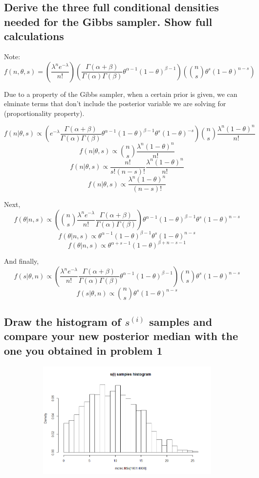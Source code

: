 \documentclass[20pt]{article} %
\begin{document}
\subsection{Derive the three full conditional densities needed for the Gibbs sampler. Show full calculations}
Note: 
$$f(n, \theta, s) = (\frac{\lambda^{n}e^{-\lambda}}{n!})(\frac{\Gamma(\alpha + \beta)}{\Gamma(\alpha)\Gamma(\beta)}\theta^{\alpha-1}(1-\theta)^{\beta-1})({n\choose s}\theta^{s}(1-\theta)^{n-s})$$

Due to a property of the Gibbs sampler, when a certain prior is given, we can elminate terms that don't include the posterior variable we are solving for (proportionality property). 

$$f(n|\theta, s) \propto (e^{-\lambda}\frac{\Gamma(\alpha + \beta)}{\Gamma(\alpha)\Gamma(\beta)}\theta^{\alpha-1}(1-\theta)^{\beta-1}\theta^{s}(1-\theta)^{-s}){n \choose s}\frac{\lambda^{n}(1-\theta)^{n}}{n!}$$
$$f(n|\theta, s) \propto {n \choose s}\frac{\lambda^{n}(1-\theta)^{n}}{n!}$$
$$f(n|\theta, s) \propto \frac{n!}{s!(n-s)!}\frac{\lambda^{n}(1-\theta)^{n}}{n!}$$
$$f(n|\theta, s) \propto \frac{\lambda^{n}(1-\theta)^{n}}{(n-s)!}$$

Next,
$$f(\theta | n,s) \propto  ({n\choose s}\frac{\lambda^{n}e^{-\lambda}}{n!}\frac{\Gamma(\alpha + \beta)}{\Gamma(\alpha)\Gamma(\beta)})\theta^{\alpha-1}(1-\theta)^{\beta-1}\theta^{s}(1-\theta)^{n-s}$$
$$f(\theta | n,s) \propto \theta^{\alpha-1}(1-\theta)^{\beta-1}\theta^{s}(1-\theta)^{n-s}$$
$$f(\theta | n,s) \propto \theta^{\alpha+s-1}(1-\theta)^{\beta+n-s-1}$$

And finally,
$$f(s|\theta, n) \propto  (\frac{\lambda^{n}e^{-\lambda}}{n!}\frac{\Gamma(\alpha + \beta)}{\Gamma(\alpha)\Gamma(\beta)}\theta^{\alpha-1}(1-\theta)^{\beta-1}){n\choose s}\theta^{s}(1-\theta)^{n-s}$$
$$f(s|\theta, n) \propto  {n\choose s}\theta^{s}(1-\theta)^{n-s}$$
\subsection{Draw the histogram of $s^{(i)}$ samples and compare your new posterior median with the one you obtained in problem 1}
\begin{figure}[!htbp]
  	\centering
   	\begin{subfigure}[p]{0.9\linewidth}
    	\includegraphics[width=\linewidth]{./figures/hw3-04.png}
   	\end{subfigure}
\end{figure} 
\end{document}
